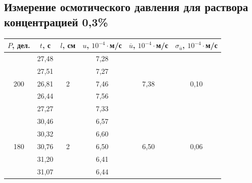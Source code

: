 \documentclass[a4paper, 12pt]{article}
\begin{document}
    \subsection{Измерение осмотического давления для раствора концентрацией 0,3\%}
        \begin{table}[H]
            \centering
            \begin{tabular}{|c|ccccc|}
            \hline
            $P$, дел. & \multicolumn{1}{c|}{$t$, с} & \multicolumn{1}{c|}{$l$, см} & \multicolumn{1}{c|}{$u$, $10^{-4} \cdot$м/с} & \multicolumn{1}{c|}{$\overline{u}$, $10^{-4} \cdot$м/с} & $\sigma_{\overline{u}}$, $10^{-4} \cdot$м/с \\ \hline
            \multirow{5}{*}{200} & \multicolumn{1}{c|}{27,48} & \multicolumn{1}{c|}{\multirow{5}{*}{2}} & \multicolumn{1}{c|}{7,28} & \multicolumn{1}{c|}{\multirow{5}{*}{7,38}} & \multirow{5}{*}{0,10} \\ \cline{2-2} \cline{4-4}
             & \multicolumn{1}{c|}{27,51} & \multicolumn{1}{c|}{} & \multicolumn{1}{c|}{7,27} & \multicolumn{1}{c|}{} &  \\ \cline{2-2} \cline{4-4}
             & \multicolumn{1}{c|}{26,81} & \multicolumn{1}{c|}{} & \multicolumn{1}{c|}{7,46} & \multicolumn{1}{c|}{} &  \\ \cline{2-2} \cline{4-4}
             & \multicolumn{1}{c|}{26,44} & \multicolumn{1}{c|}{} & \multicolumn{1}{c|}{7,56} & \multicolumn{1}{c|}{} &  \\ \cline{2-2} \cline{4-4}
             & \multicolumn{1}{c|}{27,27} & \multicolumn{1}{c|}{} & \multicolumn{1}{c|}{7,33} & \multicolumn{1}{c|}{} &  \\ \hline
            \multirow{5}{*}{180} & \multicolumn{1}{c|}{30,46} & \multicolumn{1}{c|}{\multirow{5}{*}{2}} & \multicolumn{1}{c|}{6,57} & \multicolumn{1}{c|}{\multirow{5}{*}{6,50}} & \multirow{5}{*}{0,06} \\ \cline{2-2} \cline{4-4}
             & \multicolumn{1}{c|}{30,32} & \multicolumn{1}{c|}{} & \multicolumn{1}{c|}{6,60} & \multicolumn{1}{c|}{} &  \\ \cline{2-2} \cline{4-4}
             & \multicolumn{1}{c|}{30,76} & \multicolumn{1}{c|}{} & \multicolumn{1}{c|}{6,50} & \multicolumn{1}{c|}{} &  \\ \cline{2-2} \cline{4-4}
             & \multicolumn{1}{c|}{31,20} & \multicolumn{1}{c|}{} & \multicolumn{1}{c|}{6,41} & \multicolumn{1}{c|}{} &  \\ \cline{2-2} \cline{4-4}
             & \multicolumn{1}{c|}{31,07} & \multicolumn{1}{c|}{} & \multicolumn{1}{c|}{6,44} & \multicolumn{1}{c|}{} &  \\ \hline

\end{tabular}
\end{table}
\end{document}
